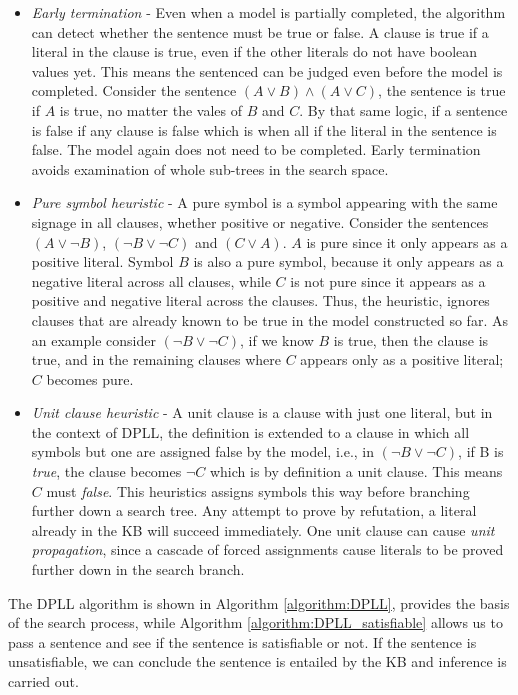 \begin{itemize}
	\item \textit{Early termination} - Even when a model is partially completed, the algorithm can detect whether the sentence must be true or false. A clause is true if a literal in the clause is true, even if the other literals do not have boolean values yet. This means the sentenced can be judged even before the model is completed. Consider the sentence $(A \vee B) \wedge (A \vee C)$, the sentence is true if $A$ is true, no matter the vales of $B$ and $C$. By that same logic, if a sentence is false if any clause is false which is when all if the literal in the sentence is false. The model again does not need to be completed. Early termination avoids examination of whole sub-trees in the search space.

	
	\item \textit{Pure symbol heuristic} - A pure symbol is a symbol appearing with the same signage in all clauses, whether positive or negative. Consider the sentences $(A \vee \neg B)$, $(\neg B \vee \neg C)$ and $(C \vee A)$. $A$ is pure since it only appears as a positive literal. Symbol $B$ is also a pure symbol, because it only appears as a negative literal across all clauses, while $C$ is not pure since it appears as a positive and negative literal across the clauses. Thus, the heuristic, ignores clauses that are already known to be true in the model constructed so far. As an example consider $(\neg B \vee \neg C)$, if we know $B$ is true, then the clause is true, and in the remaining clauses where $C$ appears only as a positive literal; $C$ becomes pure.
	
	\item \textit{Unit clause heuristic} - A unit clause is a clause with just one literal, but in the context of DPLL, the definition is extended  to a clause in which all symbols but one are assigned false by the model, i.e., in  $(\neg B \vee \neg C)$, if B is \textit{true}, the clause becomes $\neg C$ which is by definition a unit clause. This means $C$ must \textit{false}. This heuristics assigns symbols this way before branching further down a search tree. Any attempt to prove by refutation, a literal already in the KB will succeed immediately. One unit clause can cause \textit{unit propagation}, since a cascade of forced assignments cause literals to be proved further down in the search branch.


\end{itemize}

The DPLL algorithm is shown in Algorithm \ref{algorithm:DPLL}, provides the basis of the search process, while Algorithm \ref{algorithm:DPLL_satisfiable} allows us to pass a sentence and see if the sentence is satisfiable or not. If the sentence is unsatisfiable, we can conclude the sentence is entailed by the KB and inference is carried out. 

